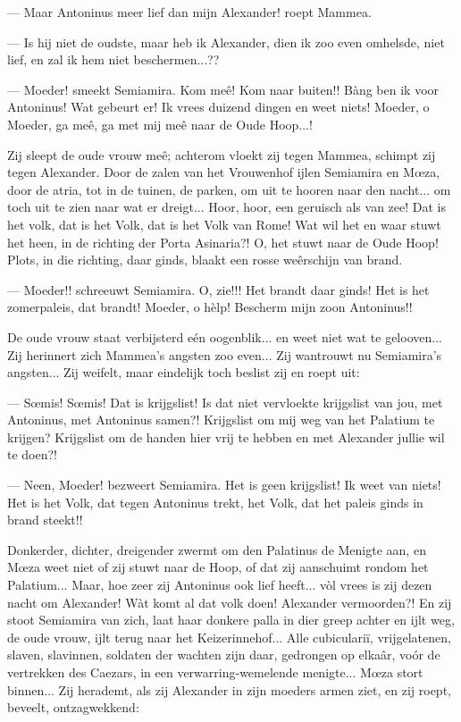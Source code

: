 \documentclass[a4paper, 12pt, oneside, dutch]{article}
\begin{document}
--- Maar Antoninus meer lief dan mijn Alexander! roept Mammea.

--- Is hij niet de oudste, maar heb ik Alexander, dien ik zoo even omhelsde, niet lief, en zal ik hem niet beschermen...??

--- Moeder! smeekt Semiamira. Kom meê! Kom naar buiten!! Bàng ben ik voor Antoninus! Wat gebeurt er! Ik vrees duizend dingen en weet niets! Moeder, o Moeder, ga meê, ga met mij meê naar de Oude Hoop...!

Zij sleept de oude vrouw meê; achterom vloekt zij tegen Mammea, schimpt zij tegen Alexander. Door de zalen van het Vrouwenhof ijlen Semiamira en Mœza, door de atria, tot in de tuinen, de parken, om uit te hooren naar den nacht... om toch uit te zien naar wat er dreigt... Hoor, hoor, een geruisch als van zee! Dat is het volk, dat is het Volk, dat is het Volk van Rome! Wat wil het en waar stuwt het heen, in de richting der Porta Asinaria?! O, het stuwt naar de Oude Hoop! Plots, in die richting, daar ginds, blaakt een rosse weêrschijn van brand.

--- Moeder!! schreeuwt Semiamira. O, zie!!! Het brandt daar ginds! Het is het zomerpaleis, dat brandt! Moeder, o hèlp! Bescherm mijn zoon Antoninus!!

De oude vrouw staat verbijsterd eén oogenblik... en weet niet wat te gelooven... Zij herinnert zich Mammea's angsten zoo even... Zij wantrouwt nu Semiamira's angsten... Zij weifelt, maar eindelijk toch beslist zij en roept uit:

--- Sœmis! Sœmis! Dat is krijgslist! Is dat niet vervloekte krijgslist van jou, met Antoninus, met Antoninus samen?! Krijgslist om mij weg van het Palatium te krijgen? Krijgslist om de handen hier vrij te hebben en met Alexander jullie wil te doen?!

--- Neen, Moeder! bezweert Semiamira. Het is geen krijgslist! Ik weet van niets! Het is het Volk, dat tegen Antoninus trekt, het Volk, dat het paleis ginds in brand steekt!!

Donkerder, dichter, dreigender zwermt om den Palatinus de Menigte aan, en Mœza weet niet of zij stuwt naar de Hoop, of dat zij aanschuimt rondom het Palatium... Maar, hoe zeer zij Antoninus ook lief heeft... vòl vrees is zij dezen nacht om Alexander! Wàt komt al dat volk doen! Alexander vermoorden?! En zij stoot Semiamira van zich, laat haar donkere palla in dier greep achter en ijlt weg, de oude vrouw, ijlt terug naar het Keizerinnehof... Alle cubiculariï, vrijgelatenen, slaven, slavinnen, soldaten der wachten zijn daar, gedrongen op elkaâr, voór de vertrekken des Caezars, in een verwarring-wemelende menigte... Mœza stort binnen... Zij herademt, als zij Alexander in zijn moeders armen ziet, en zij roept, beveelt, ontzagwekkend:
\end{document}
